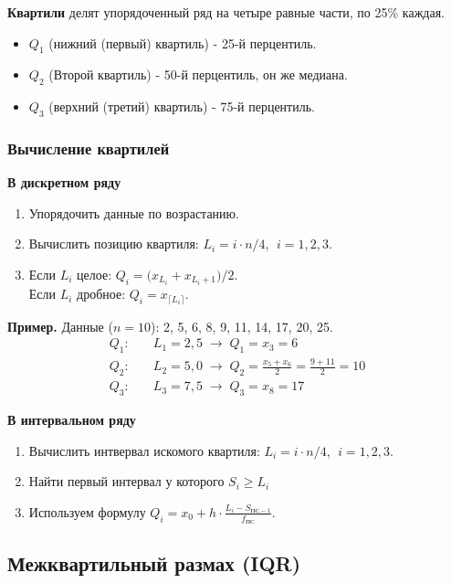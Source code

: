 \documentclass[a4paper]{article}
\begin{document}
	\textbf{Квартили} делят упорядоченный ряд на четыре равные части, по 25\% каждая.
	\begin{itemize}[noitemsep]
		\item $Q_1$ (нижний (первый) квартиль) - 25-й перцентиль.
		\item $Q_2$ (Второй квартиль) - 50-й перцентиль, он же медиана.
		\item $Q_3$ (верхний (третий) квартиль) - 75-й перцентиль.
	\end{itemize}


\subsubsection{Вычисление квартилей}

\textbf{В дискретном ряду}

\begin{enumerate}
	\item Упорядочить данные по возрастанию.
	\item Вычислить позицию квартиля: $L_i = i \cdot n / 4$, $\; i = 1,2,3$.
	\item Если $L_i$ целое: $Q_i = \bigl(x_{L_i} + x_{L_i+1}\bigr)/2$.\\
	Если $L_i$ дробное: $Q_i = x_{\lceil L_i \rceil}$.
\end{enumerate}


	\textbf{Пример.} Данные ($n=10$): 2, 5, 6, 8, 9, 11, 14, 17, 20, 25.
	\begin{align*}
		Q_1:&\quad L_1 = 2{,}5 \;\to\; Q_1 = x_3 = 6 \\
		Q_2:&\quad L_2 = 5{,}0 \;\to\; Q_2 = \tfrac{x_5+x_6}{2} = \tfrac{9+11}{2} = 10 \\
		Q_3:&\quad L_3 = 7{,}5 \;\to\; Q_3 = x_8 = 17
	\end{align*}

\textbf{В интервальном ряду}

\begin{enumerate}
	\item Вычислить интвервал искомого квартиля: $L_i = i \cdot n / 4$, $\; i = 1,2,3$.
	\item Найти первый интервал у которого $ S_i \geq  L_i$
	\item Используем формулу $ 	Q_i = x_0 + h \cdot \frac{L_i - S_{ПС-1}}{f_{ПС}}  $.
\end{enumerate}


\subsection{Межквартильный размах (IQR)}
\end{document}

